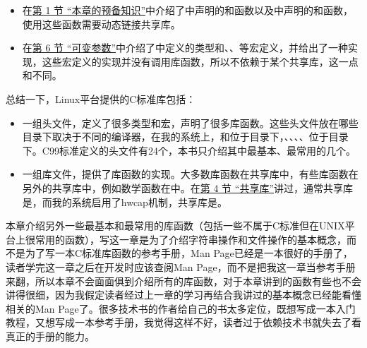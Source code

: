 \begin{itemize}
\item 在\hyperlink{db.ch24s01.id2818430}{第 1 节 “本章的预备知识”}中介绍了中声明的和函数以及中声明的和函数，使用这些函数需要动态链接共享库。

\item 在\hyperlink{db.ch24s06.id2822466}{第 6 节 “可变参数”}中介绍了中定义的类型和、、等宏定义，并给出了一种实现，这些宏定义的实现并没有调用库函数，所以不依赖于某个共享库，这一点和不同。
\end{itemize}


总结一下，Linux平台提供的C标准库包括：


\begin{itemize}

\item 一组头文件，定义了很多类型和宏，声明了很多库函数。这些头文件放在哪些目录下取决于不同的编译器，在我的系统上，和位于目录下，、、、、位于目录下。C99标准定义的头文件有24个，本书只介绍其中最基本、最常用的几个。

\item 一组库文件，提供了库函数的实现。大多数库函数在共享库中，有些库函数在另外的共享库中，例如数学函数在中。在\hyperlink{db.ch20s04.id2789683}{第 4 节 “共享库”}讲过，通常共享库是，而我的系统启用了hwcap机制，共享库是。
\end{itemize}


本章介绍另外一些最基本和最常用的库函数（包括一些不属于C标准但在UNIX平台上很常用的函数），写这一章是为了介绍字符串操作和文件操作的基本概念，而不是为了写一本C标准库函数的参考手册，Man Page已经是一本很好的手册了，读者学完这一章之后在开发时应该查阅Man Page，而不是把我这一章当参考手册来翻，所以本章不会面面俱到介绍所有的库函数，对于本章讲到的函数有些也不会讲得很细，因为我假定读者经过上一章的学习再结合我讲过的基本概念已经能看懂相关的Man Page了。很多技术书的作者给自己的书太多定位，既想写成一本入门教程，又想写成一本参考手册，我觉得这样不好，读者过于依赖技术书就失去了看真正的手册的能力。

